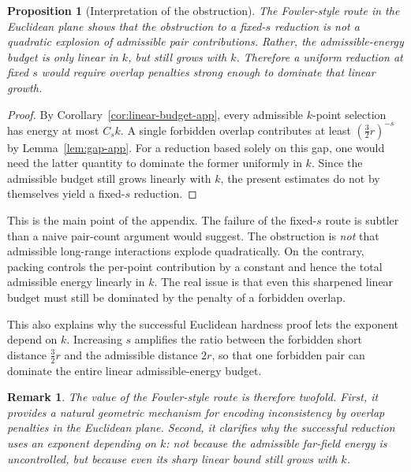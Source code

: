 \documentclass[11pt]{article}
\newtheorem{proposition}{Proposition}
\newtheorem{remark}{Remark}
\begin{document}
\begin{proposition}[Interpretation of the obstruction]
\label{prop:fowler-obstruction-app}
The Fowler-style route in the Euclidean plane shows that the obstruction to a fixed-$s$ reduction is not a quadratic explosion of admissible pair contributions. Rather, the admissible-energy budget is only linear in $k$, but still grows with $k$. Therefore a uniform reduction at fixed $s$ would require overlap penalties strong enough to dominate that linear growth.
\end{proposition}

\begin{proof}
By Corollary~\ref{cor:linear-budget-app}, every admissible $k$-point selection has energy at most $C_s k$. A single forbidden overlap contributes at least $\left(\tfrac{3}{2}r\right)^{-s}$ by Lemma~\ref{lem:gap-app}. For a reduction based solely on this gap, one would need the latter quantity to dominate the former uniformly in $k$. Since the admissible budget still grows linearly with $k$, the present estimates do not by themselves yield a fixed-$s$ reduction.
\end{proof}

This is the main point of the appendix. The failure of the fixed-$s$ route is subtler than a naive pair-count argument would suggest. The obstruction is \emph{not} that admissible long-range interactions explode quadratically. On the contrary, packing controls the per-point contribution by a constant and hence the total admissible energy linearly in $k$. The real issue is that even this sharpened linear budget must still be dominated by the penalty of a forbidden overlap.

This also explains why the successful Euclidean hardness proof lets the exponent depend on $k$. Increasing $s$ amplifies the ratio between the forbidden short distance $\tfrac{3}{2}r$ and the admissible distance $2r$, so that one forbidden pair can dominate the entire linear admissible-energy budget.

\begin{remark}
The value of the Fowler-style route is therefore twofold. First, it provides a natural geometric mechanism for encoding inconsistency by overlap penalties in the Euclidean plane. Second, it clarifies why the successful reduction uses an exponent depending on $k$: not because the admissible far-field energy is uncontrolled, but because even its sharp linear bound still grows with $k$.
\end{remark}
\end{document}
